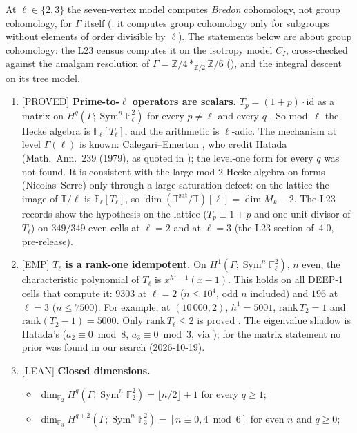 \documentclass[11pt]{article}
\newcommand{\Z}{\mathbb{Z}}
\newcommand{\F}{\mathbb{F}}
\newcommand{\Fl}{\mathbb{F}_\ell}
\newcommand{\T}{\mathbb{T}}
\newcommand{\Sym}{\operatorname{Sym}}
\newcommand{\Ga}{\Gamma}
\newcommand{\PROVED}{\textsf{\small[PROVED]}}
\newcommand{\EMP}{\textsf{\small[EMP]}}
\begin{document}
At $\ell\in\{2,3\}$ the seven-vertex model computes \emph{Bredon} cohomology, not group cohomology, for $\Ga$ itself
({}: it computes group cohomology only for subgroups without elements of order divisible by $\ell$). The
statements below are about group cohomology: the L23 census computes it on the isotropy model $C_I$, cross-checked against the amalgam
resolution of $\Ga=\Z/4\ast_{\Z/2}\Z/6$ ({\ttfamily[C,~cl:amalgam]}), and the integral descent on its tree model.
\begin{enumerate}[leftmargin=1.8em,itemsep=2pt]
\item \PROVED{} \textbf{Prime-to-$\ell$ operators are scalars.} $T_p=(1+p)\cdot\mathrm{id}$ as a matrix on $H^{q}(\Ga;\Sym^{n}\Fl^{2})$ for
  every $p\ne\ell$ and every $q$ {}. So mod~$\ell$ the Hecke algebra is $\Fl[T_\ell]$, and the arithmetic is
  $\ell$-adic. The mechanism at level $\Ga(\ell)$ is known: Calegari--Emerton \cite[Lemma~3.1]{ph_ce_largeindex}, who credit Hatada
  (Math.\ Ann.\ 239 (1979), as quoted in \cite{ph_rustom}); the level-one form for every $q$ was not found. It is consistent with the large
  mod-$2$ Hecke algebra on forms (Nicolas--Serre) only through a large saturation defect: on the lattice the image of $\T/\ell$ is
  $\Fl[T_\ell]$, so $\dim(\T^{\mathrm{sat}}/\T)[\ell]=\dim M_k-2$. The L23 records show the hypothesis on the lattice ($T_p\equiv1+p$ and one unit
  divisor of $T_\ell$) on $349/349$ even cells at $\ell=2$ and at $\ell=3$ (the L23 section of~4.0, pre-release).
\item \EMP{} \textbf{$T_\ell$ is a rank-one idempotent.} On $H^{1}(\Ga;\Sym^{n}\Fl^{2})$, $n$ even, the characteristic polynomial of
  $T_\ell$ is $x^{h^{1}-1}(x-1)$. This holds on all DEEP-1 cells that compute it: $9303$ at $\ell=2$ ($n\le10^{4}$, odd $n$ included) and $196$ at $\ell=3$ ($n\le7500$). For
  example, at $(10\,000,2)$, $h^{1}=5001$, $\mathrm{rank}\,T_2=1$ and $\mathrm{rank}(T_2-1)=5000$. Only $\mathrm{rank}\,T_\ell\le2$ is proved
  {}. The eigenvalue shadow is Hatada's ($a_2\equiv0\bmod8$, $a_3\equiv0\bmod3$, via \cite{ph_rustom});
  for the matrix statement no prior was found in our search (2026-10-19).
\item \textsf{\small[LEAN]} \textbf{Closed dimensions.}
  \begin{itemize}[itemsep=0pt]
  \item $\dim_{\F_2}H^{q}(\Ga;\Sym^{n}\F_2^{2})=\lfloor n/2\rfloor+1$ for every $q\ge1$;
  \item $\dim_{\F_3}H^{q+2}(\Ga;\Sym^{n}\F_3^{2})=[n\equiv0,4\bmod 6]$ for even $n$ and $q\ge0$;

\end{itemize}
\end{enumerate}
\end{document}
